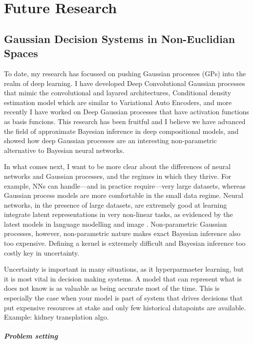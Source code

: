 \chapter{Future Research}

\section{Gaussian Decision Systems in Non-Euclidian Spaces}

To date, my research has focussed on pushing Gaussian processes (GPs) into the realm of deep learning. I have developed Deep Convolutional Gaussian processes that mimic the convolutional and layared architectures, Conditional density estimation model which are similar to Variational Auto Encoders, and more recently I have worked on Deep Gaussian processes that have activation functions as basis funcions. This research has been fruitful and I believe we have advanced the field of approximate Bayesian inference in deep compositional models, and showed how deep Gaussian processes are an interesting non-parametric alternative to Bayesian neural networks.

In what comes next, I want to be more clear about the differences of neural networks and Gaussian processes, and the regimes in which they thrive. For example, NNs can handle---and in practice require---very large datasets, whereas Gaussian process models are more comfortable in the small data regime. Neural networks, in the presence of large datasets, are extremely good at learning integrate latent representations in very non-linear tasks, as evidenced by the latest models in language modelling and image . Non-parametric Gaussian processes, however, 
non-parametric nature makes exact Bayesian inference also too expensive. 
Defining a kernel is extremely difficult and Bayesian inference too costly
key in uncertainty.

Uncertainty is important in many situations, as it hyperparmaeter learning, but it is most vital in decision making systems. A model that can represent what is does not know is as valuable as being accurate most of the time. This is especially the case when your model is part of system that drives decisions that put expensive resources at stake and only few historical datapoints are available. Example: kidney transplation algo.

\paragraph{Problem setting}

